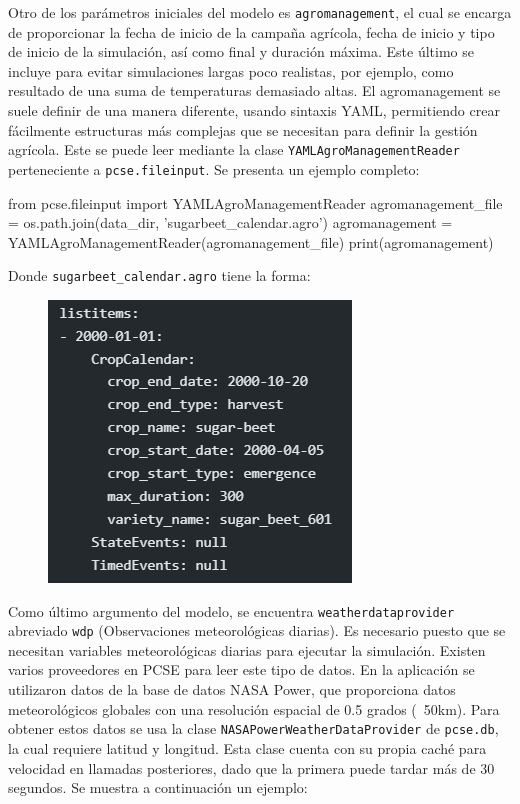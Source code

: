 Otro de los parámetros iniciales del modelo es \lstinline|agromanagement|, el cual se encarga de proporcionar la fecha de inicio de la campaña agrícola, fecha de inicio y tipo de inicio de la simulación, así como final y duración máxima. Este último se incluye para evitar simulaciones largas poco realistas, por ejemplo, como resultado de una suma de temperaturas demasiado altas.
El agromanagement se suele definir de una manera diferente, usando sintaxis YAML, permitiendo crear fácilmente estructuras más complejas que se necesitan para definir la gestión agrícola. Este se puede leer mediante la clase \lstinline|YAMLAgroManagementReader| perteneciente a \lstinline|pcse.fileinput|.
Se presenta un ejemplo completo:

\begin{python}
	from pcse.fileinput import YAMLAgroManagementReader
	agromanagement_file = os.path.join(data_dir, 'sugarbeet_calendar.agro')
	agromanagement = YAMLAgroManagementReader(agromanagement_file)
	print(agromanagement)
\end{python}

Donde \lstinline|sugarbeet_calendar.agro| tiene la forma:

\begin{figure}[!h]
	\centering
	\includegraphics[width=0.4\linewidth]{Images/yaml_agro}
	\caption{}
	\label{fig:yamlagro}
\end{figure}

Como último argumento del modelo, se encuentra \lstinline|weatherdataprovider| abreviado \lstinline|wdp| (Observaciones meteorológicas diarias). Es necesario puesto que se necesitan variables meteorológicas diarias para ejecutar la simulación. Existen varios proveedores en PCSE para leer este tipo de datos. En la aplicación se utilizaron datos de la base de datos NASA Power, que proporciona datos meteorológicos globales con una resolución espacial de 0.5 grados (~50km). Para obtener estos datos se usa la clase \lstinline|NASAPowerWeatherDataProvider| de \lstinline|pcse.db|, la cual requiere latitud y longitud. Esta clase cuenta con su propia caché para velocidad en llamadas posteriores, dado que la primera puede tardar más de 30 segundos. Se muestra a continuación un ejemplo:

